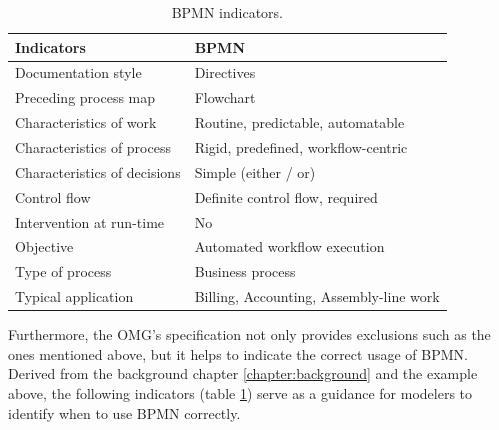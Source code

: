 \begin{table}[!ht]
\centering
\begin{tabular}{@{}ll@{}}
\toprule
Indicators                   & BPMN                                    \\ \midrule
Documentation style          & Directives                              \\
Preceding process map        & Flowchart                               \\
Characteristics of work      & Routine, predictable, automatable       \\
Characteristics of process   & Rigid, predefined, workflow-centric     \\
Characteristics of decisions & Simple (either / or)                    \\
Control flow                 & Definite control flow, required         \\
Intervention at run-time     & No                                      \\
Objective                    & Automated workflow execution            \\
Type of process              & Business process                        \\
Typical application          & Billing, Accounting, Assembly-line work \\ \bottomrule
\end{tabular}
\caption{BPMN indicators.}
\label{tab:bpmnIndicatorsTable}
\end{table}

Furthermore, the OMG's specification not only provides exclusions such as the ones mentioned above, but it helps to indicate the correct usage of BPMN. Derived from the background chapter \ref{chapter:background} and the example above, the following indicators (table \ref{tab:bpmnIndicatorsTable}) serve as a guidance for modelers to identify when to use BPMN correctly. 

